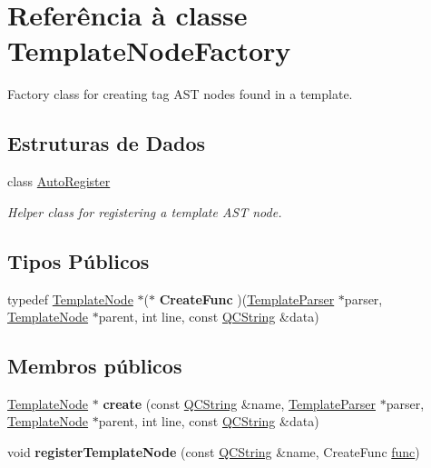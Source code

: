 \hypertarget{class_template_node_factory}{\section{Referência à classe Template\-Node\-Factory}
\label{class_template_node_factory}
}


Factory class for creating tag A\-S\-T nodes found in a template.  


\subsection*{Estruturas de Dados}
\begin{DoxyCompactItemize}
\item 
class \hyperlink{class_template_node_factory_1_1_auto_register}{Auto\-Register}
\begin{DoxyCompactList}\small\item\em Helper class for registering a template A\-S\-T node. \end{DoxyCompactList}\end{DoxyCompactItemize}
\subsection*{Tipos Públicos}
\begin{DoxyCompactItemize}
\item 
\hypertarget{class_template_node_factory_aac3cbdd7c1018efa9ecebd273de35c0b}{typedef \hyperlink{class_template_node}{Template\-Node} $\ast$($\ast$ {\bfseries Create\-Func} )(\hyperlink{class_template_parser}{Template\-Parser} $\ast$parser, \hyperlink{class_template_node}{Template\-Node} $\ast$parent, int line, const \hyperlink{class_q_c_string}{Q\-C\-String} \&data)}\label{class_template_node_factory_aac3cbdd7c1018efa9ecebd273de35c0b}

\end{DoxyCompactItemize}
\subsection*{Membros públicos}
\begin{DoxyCompactItemize}
\item 
\hypertarget{class_template_node_factory_a77068d270712320de21d7691c9f81a75}{\hyperlink{class_template_node}{Template\-Node} $\ast$ {\bfseries create} (const \hyperlink{class_q_c_string}{Q\-C\-String} \&name, \hyperlink{class_template_parser}{Template\-Parser} $\ast$parser, \hyperlink{class_template_node}{Template\-Node} $\ast$parent, int line, const \hyperlink{class_q_c_string}{Q\-C\-String} \&data)}\label{class_template_node_factory_a77068d270712320de21d7691c9f81a75}

\item 
\hypertarget{class_template_node_factory_a687933273aaaa90abeacda77cd20349a}{void {\bfseries register\-Template\-Node} (const \hyperlink{class_q_c_string}{Q\-C\-String} \&name, Create\-Func \hyperlink{036__link_8c_affb6da6cff1b57cdf8efc0123dceac9b}{func})}\label{class_template_node_factory_a687933273aaaa90abeacda77cd20349a}

\end{DoxyCompactItemize}
